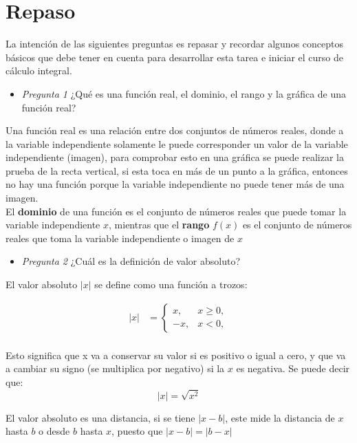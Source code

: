 \section{Repaso}

La intención de las siguientes preguntas es repasar y recordar algunos conceptos básicos que debe tener en cuenta para desarrollar esta tarea e iniciar el curso de cálculo integral.

\begin{itemize}
    \item \textit{Pregunta 1} ¿Qué es una función real, el dominio, el rango y la gráfica de una función real?
\end{itemize}

Una función real es una relación entre dos conjuntos de números reales, donde a la variable independiente solamente le puede corresponder un valor de la variable independiente (imagen), para comprobar esto en una gráfica se puede realizar la prueba de la recta vertical, si esta toca en más de un punto a la gráfica, entonces no hay una función porque la variable independiente no puede tener más de una imagen.\\

El \textbf{dominio} de una función es el conjunto de números reales que puede tomar la variable independiente $x$, mientras que el \textbf{rango} $f(x)$ es el conjunto de números reales que toma la variable independiente o imagen de $x$

\begin{itemize}
    \item \textit{Pregunta 2} ¿Cuál es la definición de valor absoluto?
\end{itemize}

El valor absoluto $|x|$ se define como una función a trozos:

\begin{align*}
    |x| &=
    \begin{cases}
        x, & x \geq 0, \\
        -x, & x < 0,
    \end{cases} \\
\end{align*}

Esto significa que x va a conservar su valor si es positivo o igual a cero, y que va a cambiar su signo (se multiplica por negativo) si la $x$ es negativa. Se puede decir que:
\[
|x| = \sqrt{x^2}
\]

El valor absoluto es una distancia, si se tiene $|x - b|$, este mide la distancia de $x$ hasta $b$ o desde $b$ hasta $x$, puesto que $|x - b| = |b - x|$


